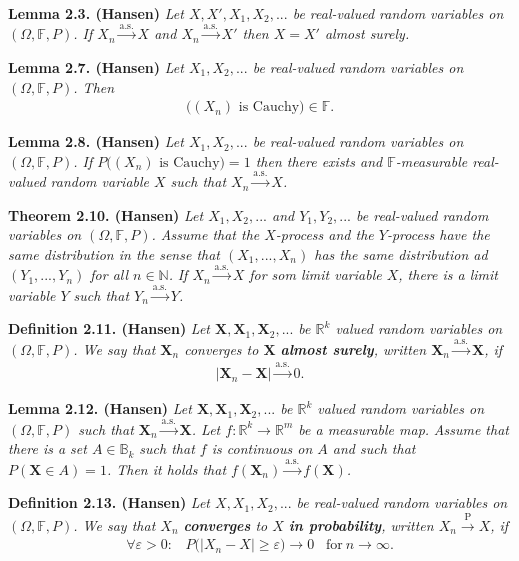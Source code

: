 \documentclass[a4paper,10pt,openany]{book}
\begin{document}
\textbf{Lemma 2.3. (Hansen)} \emph{Let \(X,X',X_1,X_2,...\) be real-valued random variables on \((\Omega,\mathbb{F},P)\). If \(X_n\stackrel{\text{a.s.}}{\to}X\) and \(X_n\stackrel{\text{a.s.}}{\to}X'\) then \(X=X'\) almost surely.}

\textbf{Lemma 2.7. (Hansen)} \emph{Let \(X_1,X_2,...\) be real-valued random variables on \((\Omega,\mathbb{F},P)\). Then}
\begin{align*}
    \Big((X_n)\text{ is Cauchy}\Big)\in \mathbb{F}.
\end{align*}

\textbf{Lemma 2.8. (Hansen)} \emph{Let \(X_1,X_2,...\) be real-valued random variables on \((\Omega,\mathbb{F},P)\). If \(P\Big((X_n)\text{ is Cauchy}\Big)=1\) then there exists and \(\mathbb{F}\)-measurable real-valued random variable \(X\) such that \(X_n\stackrel{\text{a.s.}}{\to}X\).}

\textbf{Theorem 2.10. (Hansen)} \emph{Let \(X_1,X_2,...\) and \(Y_1,Y_2,...\) be real-valued random variables on \((\Omega,\mathbb{F},P)\). Assume that the \(X\)-process and the \(Y\)-process have the same distribution in the sense that \((X_1,...,X_n)\) has the same distribution ad \((Y_1,...,Y_n)\) for all \(n\in\mathbb{N}\).}
\emph{If \(X_n\stackrel{\text{a.s.}}{\to}X\) for som limit variable \(X\), there is a limit variable \(Y\) such that \(Y_n\stackrel{\text{a.s.}}{\to}Y\).}

\textbf{Definition 2.11. (Hansen)} \emph{Let \(\mathbf{X},\mathbf{X}_1,\mathbf{X}_2,...\) be \(\mathbb{R}^k\) valued random variables on \((\Omega, \mathbb{F},P)\). We say that \(\mathbf{X}_n\) converges to \(\mathbf{X}\) \textbf{almost surely}, written \(\mathbf{X}_n\stackrel{\text{a.s.}}{\to}\mathbf{X}\), if}
\begin{align*}
    \vert\mathbf{X}_n-\mathbf{X}\vert \stackrel{\text{a.s.}}{\to} 0.\tag{2.15}
\end{align*}

\textbf{Lemma 2.12. (Hansen)} \emph{Let \(\mathbf{X},\mathbf{X}_1,\mathbf{X}_2,...\) be \(\mathbb{R}^k\) valued random variables on \((\Omega, \mathbb{F},P)\) such that \(\mathbf{X}_n\stackrel{\text{a.s.}}{\to}\mathbf{X}\). Let \(f : \mathbb{R}^k\to\mathbb{R}^m\) be a measurable map.}
\emph{Assume that there is a set \(A\in \mathbb{B}_k\) such that \(f\) is continuous on \(A\) and such that \(P(\mathbf{X}\in A)=1\). Then it holds that \(f(\mathbf{X}_n)\stackrel{\text{a.s.}}{\to} f(\mathbf{X})\).}

\textbf{Definition 2.13. (Hansen)} \emph{Let \(X,X_1,X_2,...\) be real-valued random variables on \((\Omega,\mathbb{F},P)\). We say that \(X_n\) \textbf{converges} to \(X\) \textbf{in probability}, written \(X_n\stackrel{\text{P}}{\to} X\), if}
\begin{align*}
    \forall \varepsilon>0 :\hspace{10pt} P\big(\vert X_n-X\vert\ge \varepsilon\big)\to 0\hspace{10pt}\text{for}\ n\to \infty.\tag{2.17}
\end{align*}
\end{document}
